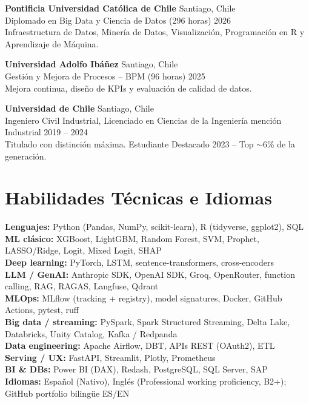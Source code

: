 \documentclass[a4paper,10pt]{article}
\newcommand{\entryspace}{\vspace{5pt}}
\begin{document}
\textbf{Pontificia Universidad Católica de Chile} \hfill Santiago, Chile \\
Diplomado en Big Data y Ciencia de Datos (296 horas) \hfill 2026 \\
Infraestructura de Datos, Minería de Datos, Visualización, Programación en R y Aprendizaje de Máquina.

\entryspace

\textbf{Universidad Adolfo Ibáñez} \hfill Santiago, Chile \\
Gestión y Mejora de Procesos -- BPM (96 horas) \hfill 2025 \\
Mejora continua, diseño de KPIs y evaluación de calidad de datos.

\entryspace

\textbf{Universidad de Chile} \hfill Santiago, Chile \\
Ingeniero Civil Industrial, Licenciado en Ciencias de la Ingeniería mención Industrial \hfill 2019 -- 2024 \\
Titulado con distinción máxima. Estudiante Destacado 2023 -- Top $\sim$6\% de la generación.

\section*{Habilidades Técnicas e Idiomas}

\textbf{Lenguajes:} Python (Pandas, NumPy, scikit-learn), R (tidyverse, ggplot2), SQL \\
\textbf{ML clásico:} XGBoost, LightGBM, Random Forest, SVM, Prophet, LASSO/Ridge, Logit, Mixed Logit, SHAP \\
\textbf{Deep learning:} PyTorch, LSTM, sentence-transformers, cross-encoders \\
\textbf{LLM / GenAI:} Anthropic SDK, OpenAI SDK, Groq, OpenRouter, function calling, RAG, RAGAS, Langfuse, Qdrant \\
\textbf{MLOps:} MLflow (tracking + registry), model signatures, Docker, GitHub Actions, pytest, ruff \\
\textbf{Big data / streaming:} PySpark, Spark Structured Streaming, Delta Lake, Databricks, Unity Catalog, Kafka / Redpanda \\
\textbf{Data engineering:} Apache Airflow, DBT, APIs REST (OAuth2), ETL \\
\textbf{Serving / UX:} FastAPI, Streamlit, Plotly, Prometheus \\
\textbf{BI \& DBs:} Power BI (DAX), Redash, PostgreSQL, SQL Server, SAP \\
\textbf{Idiomas:} Español (Nativo), Inglés (Professional working proficiency, B2+); GitHub portfolio bilingüe ES/EN
\end{document}
